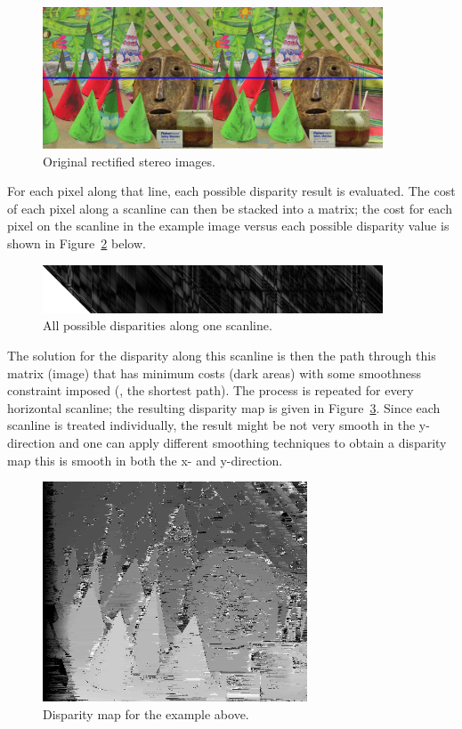 \begin{figure}[htpb]
  \centering
  \includegraphics[width=0.9\textwidth]{Figures/input_imagery_and_scanline}
  \caption{Original rectified stereo images.}%
  \label{fig:stereo_image}
\end{figure}

For each pixel along that line, each possible disparity result is evaluated. The
cost of each pixel along a scanline can then be stacked into a matrix; the cost
for each pixel on the scanline in the example image versus each possible
disparity value is shown in Figure~\ref{fig:scanline} below.

\begin{figure}[htpb]
  \centering \includegraphics[width=0.9\textwidth]{Figures/scanline_costs}
  \caption{All possible disparities along one scanline.}%
  \label{fig:scanline}
\end{figure}

The solution for the disparity along this scanline is then the path through this
matrix (image) that has minimum costs (dark areas) with some smoothness
constraint imposed (\ie, the shortest path). The process is repeated for every
horizontal scanline; the resulting disparity map is given in
Figure~\ref{fig:disperity_map}. Since each scanline is treated individually, the
result might be not very smooth in the y-direction and one can apply different
smoothing techniques to obtain a disparity map this is smooth in both the x- and
y-direction.

\begin{figure}[htpb]
  \centering
  \includegraphics[width=0.7\textwidth]{Figures/cones_scanline_optimization_only}%
  \caption{Disparity map for the example above.}%
  \label{fig:disperity_map}
\end{figure}

